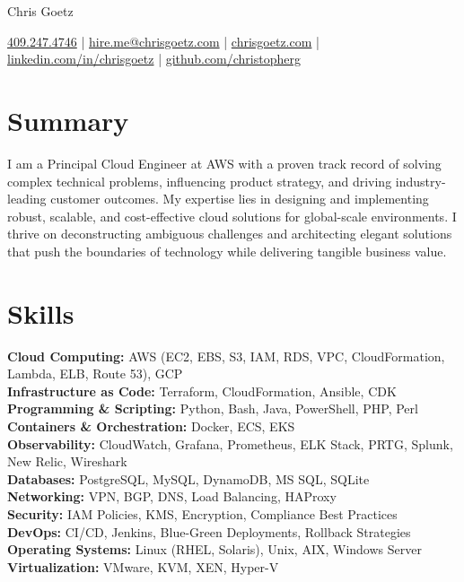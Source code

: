 \documentclass[11pt]{article}
\begin{document}
\centerline{\Huge Chris Goetz}
\vspace{5pt}
\centerline{\href{tel:409.247.4746}{409.247.4746} | \href{mailto:hire.me@chrisgoetz.com}{hire.me@chrisgoetz.com} | \href{https://www.chrisgoetz.com}{chrisgoetz.com} | \href{https://linkedin.com/in/chrisgoetz}{linkedin.com/in/chrisgoetz} | \href{https://github.com/christopherg}{github.com/christopherg}}
\vspace{-10pt}

\section*{Summary}
I am a Principal Cloud Engineer at AWS with a proven track record of solving complex technical problems, influencing product strategy, and driving industry-leading customer outcomes. My expertise lies in designing and implementing robust, scalable, and cost-effective cloud solutions for global-scale environments. I thrive on deconstructing ambiguous challenges and architecting elegant solutions that push the boundaries of technology while delivering tangible business value.

\vspace{-6.5pt}

\section*{Skills}
\textbf{Cloud Computing:} AWS (EC2, EBS, S3, IAM, RDS, VPC, CloudFormation, Lambda, ELB, Route 53), GCP \\
\textbf{Infrastructure as Code:} Terraform, CloudFormation, Ansible, CDK \\
\textbf{Programming \& Scripting:} Python, Bash, Java, PowerShell, PHP, Perl \\
\textbf{Containers \& Orchestration:} Docker, ECS, EKS \\
\textbf{Observability:} CloudWatch, Grafana, Prometheus, ELK Stack, PRTG, Splunk, New Relic, Wireshark \\
\textbf{Databases:} PostgreSQL, MySQL, DynamoDB, MS SQL, SQLite \\
\textbf{Networking:} VPN, BGP, DNS, Load Balancing, HAProxy \\
\textbf{Security:} IAM Policies, KMS, Encryption, Compliance Best Practices \\
\textbf{DevOps:} CI/CD, Jenkins, Blue-Green Deployments, Rollback Strategies \\
\textbf{Operating Systems:} Linux (RHEL, Solaris), Unix, AIX, Windows Server \\
\textbf{Virtualization:} VMware, KVM, XEN, Hyper-V
\end{document}

